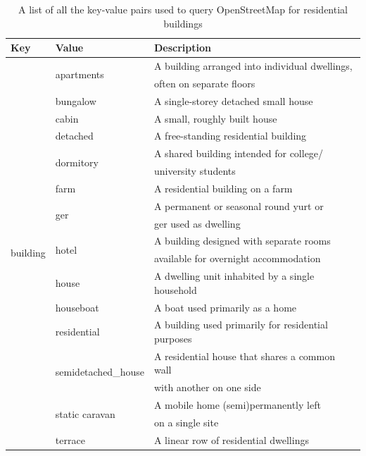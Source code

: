 \begin{table}[H]
\caption{A list of all the key-value pairs used to query OpenStreetMap for residential buildings \label{OSM_2}}
\begin{tabular}{l l l}
\toprule
\textbf{Key} & \textbf{Value} & \textbf{Description} \\
\midrule
\multirow{21}{*}{building} & \multirow{2}{*}{apartments} & A building arranged into individual dwellings, \\
& & often on separate floors \\
& bungalow & A single-storey detached small house \\
& cabin & A small, roughly built house \\
& detached & A free-standing residential building \\
& \multirow{2}{*}{dormitory} & A shared building intended for college/\\
& & university students \\
& farm & A residential building on a farm \\
& \multirow{2}{*}{ger} & A permanent or seasonal round yurt or \\
& & ger used as dwelling \\
& \multirow{2}{*}{hotel} & A building designed with separate rooms \\
& & available for overnight accommodation \\
& house & A dwelling unit inhabited by a single household \\
& houseboat & A boat used primarily as a home\\
& residential & A building used primarily for residential purposes \\
& \multirow{2}{*}{semidetached\_house} & A residential house that shares a common wall \\
& & with another on one side \\
& \multirow{2}{*}{static caravan} & A mobile home (semi)permanently left \\
& & on a single site \\
& terrace & A linear row of residential dwellings \\
\bottomrule
\end{tabular}
\end{table}
\clearpage
